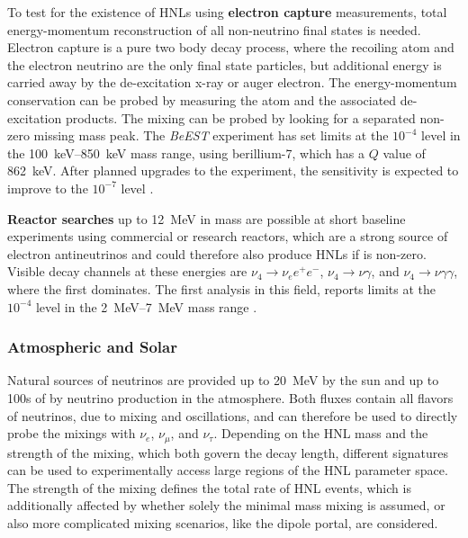 To test for the existence of HNLs using \textbf{electron capture} measurements, total energy-momentum reconstruction of all non-neutrino final states is needed. Electron capture is a pure two body decay process, where the recoiling atom and the electron neutrino are the only final state particles, but additional energy is carried away by the de-excitation x-ray or auger electron. The energy-momentum conservation can be probed by measuring the atom and the associated de-excitation products. The mixing  can be probed by looking for a separated non-zero missing mass peak. The \textit{BeEST} experiment has set limits at the $10^{-4}$ level in the \SIrange{100}{850}{\kilo\electronvolt} mass range, using berillium-7, which has a $Q$ value of \SI{862}{\kilo\electronvolt}. After planned upgrades to the experiment, the sensitivity is expected to improve to the $10^{-7}$ level .

\textbf{Reactor searches} up to \SI{12}{\mega\electronvolt} in mass are possible at short baseline experiments using commercial or research reactors, which are a strong source of electron antineutrinos and could therefore also produce HNLs if  is non-zero. Visible decay channels at these energies are $\nu_4 \rightarrow \nu_e e^+ e^-$, $\nu_4 \rightarrow \nu \gamma$, and $\nu_4 \rightarrow \nu \gamma \gamma$, where the first dominates. The first analysis in this field, reports limits at the $10^{-4}$ level in the \SIrange{2}{7}{\mega\electronvolt} mass range .



\subsubsection{Atmospheric and Solar}

Natural sources of neutrinos are provided up to \SI{20}{\mega\electronvolt} by the sun and up to 100s of \si{\gev} by neutrino production in the atmosphere. Both fluxes contain all flavors of neutrinos, due to mixing and oscillations, and can therefore be used to directly probe the mixings with $\nu_e$, $\nu_\mu$, and $\nu_\tau$. Depending on the HNL mass and the strength of the mixing, which both govern the decay length, different signatures can be used to experimentally access large regions of the HNL parameter space. The strength of the mixing defines the total rate of HNL events, which is additionally affected by whether solely the minimal mass mixing is assumed, or also more complicated mixing scenarios, like the dipole portal, are considered.

